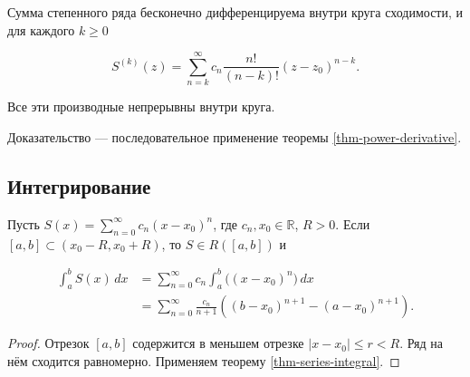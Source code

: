 \begin{cor}\label{cor-power-higher-derivatives}

Сумма степенного ряда бесконечно дифференцируема внутри круга сходимости, и для каждого \(k\ge0\)

\begin{equation}
S^{(k)}(z)=\sum_{n=k}^\infty c_n\frac{n!}{(n-k)!}(z-z_0)^{n-k}.
\label{eq-power-higher-derivatives}
\end{equation}

Все эти производные непрерывны внутри круга.

\end{cor}

Доказательство --- последовательное применение теоремы \ref{thm-power-derivative}.

\subsection{Интегрирование}\label{sec-power-series-03-2}

\begin{theorem}\label{thm-power-integral}

Пусть \(S(x)=\sum_{n=0}^\infty c_n(x-x_0)^n\), где \(c_n,x_0\in\mathbb R\), \(R>0\). Если \([a,b]\subset(x_0-R,x_0+R)\), то \(S\in R([a,b])\) и

\begin{equation}
\begin{aligned}
\int_a^b S(x)\,dx
&=\sum_{n=0}^\infty c_n\int_a^b \bigl((x-x_0)^n\bigr)\,dx\\
&=\sum_{n=0}^\infty\frac{c_n}{n+1}
\left((b-x_0)^{n+1}-(a-x_0)^{n+1}\right).
\end{aligned}
\label{eq-power-integral}
\end{equation}

\end{theorem}

\begin{proof}

Отрезок \([a,b]\) содержится в меньшем отрезке \(|x-x_0|\le r<R\). Ряд на нём сходится равномерно. Применяем теорему \ref{thm-series-integral}.

\end{proof}

